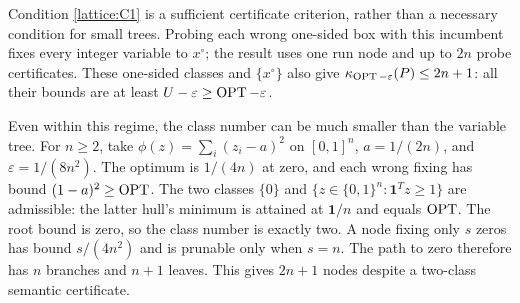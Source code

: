 Condition \eqref{lattice:C1} is a sufficient certificate criterion, rather
than a necessary condition for small trees. Probing each wrong one-sided
box with this incumbent fixes every integer variable to $x^\circ$; the
result uses one run node and up to $2n$ probe certificates. These
one-sided classes and $\{x^\circ\}$ also give
$\kappa_{\operatorname{OPT}-\varepsilon}(P)\le2n+1$: all their bounds are at least
$U-\varepsilon\ge\operatorname{OPT}-\varepsilon$.

Even within this regime, the class number can be much smaller than the
variable tree. For $n\ge2$, take $\phi(z)=\sum_i(z_i-a)^2$ on
$[0,1]^n$, $a=1/(2n)$, and $\varepsilon=1/(8n^2)$.
The optimum is $1/(4n)$ at zero, and each wrong fixing has bound
$(1-a)^2\ge\operatorname{OPT}$. The two classes $\{0\}$ and
$\{z\in\{0,1\}^n:\mathbf1^Tz\ge1\}$ are admissible: the latter hull's
minimum is attained at $\mathbf1/n$ and equals $\operatorname{OPT}$. The root bound is
zero, so the class number is exactly two. A node fixing only $s$ zeros has
bound $s/(4n^2)$ and is prunable only when $s=n$. The path to zero therefore
has $n$ branches and $n+1$ leaves. This gives $2n+1$ nodes despite a
two-class semantic certificate.
